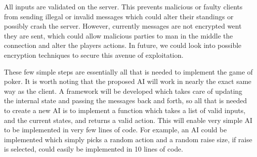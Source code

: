 All inputs are validated on the server. This prevents malicious or faulty
clients from sending illegal or invalid messages which could alter their
standings or possibly crash the server. However, currently messages are not
encrypted went they are sent, which could allow malicious parties to man in the
middle the connection and alter the players actions. In future, we could look
into possible encryption techniques to secure this avenue of exploitation.

These few simple steps are essentially all that is needed to implement the
game of poker. It is worth noting that the proposed AI will work in nearly the 
exact same way as the client. A framework will be developed which takes care of 
updating the internal state and passing the messages back and forth, so all 
that is needed to create a new AI is to implement a function which takes a list
of valid inputs, and the current states, and returns a valid action. This will
enable very simple AI to be implemented in very few lines of code. For example,
an AI could be implemented which simply picks a random action and a random 
raise size, if raise is selected, could easily be implemented in 10 lines of
code.
